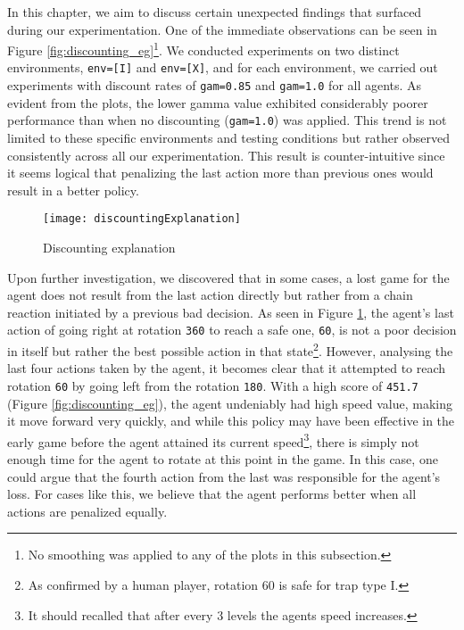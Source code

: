 In this chapter, we aim to discuss certain unexpected findings that surfaced during our experimentation. One of the immediate observations can be seen in Figure \ref{fig:discounting_eg}\footnote{No smoothing was applied to any of the plots in this subsection.}. We conducted experiments on two distinct environments, \texttt{env=[I]} and \texttt{env=[X]}, and for each environment, we carried out experiments with discount rates of \texttt{gam=0.85} and \texttt{gam=1.0} for all agents. As evident from the plots, the lower gamma value exhibited considerably poorer performance than when no discounting (\texttt{gam=1.0}) was applied. This trend is not limited to these specific environments and testing conditions but rather observed consistently across all our experimentation. This result is counter-intuitive since it seems logical that penalizing the last action more than previous ones would result in a better policy.

\begin{figure}[h]
    \centering
    \texttt{[image: discountingExplanation]}
    \caption{Discounting explanation}
    \label{fig:discounting_expl}
\end{figure}

Upon further investigation, we discovered that in some cases, a lost game for the agent does not result from the last action directly but rather from a chain reaction initiated by a previous bad decision. As seen in Figure \ref{fig:discounting_expl}, the agent's last action of going right at rotation \texttt{360} to reach a safe one, \texttt{60}, is not a poor decision in itself but rather the best possible action in that state\footnote{As confirmed by a human player, rotation 60 is safe for trap type I.}. However, analysing the last four actions taken by the agent, it becomes clear that it attempted to reach rotation \texttt{60} by going left from the rotation \texttt{180}. With a high score of \texttt{451.7} (Figure \ref{fig:discounting_eg}), the agent undeniably had high speed value, making it move forward very quickly, and while this policy may have been effective in the early game before the agent attained its current speed\footnote{It should recalled that after every 3 levels the agents speed increases.}, there is simply not enough time for the agent to rotate at this point in the game. In this case, one could argue that the fourth action from the last was responsible for the agent's loss. For cases like this, we believe that the agent performs better when all actions are penalized equally.

